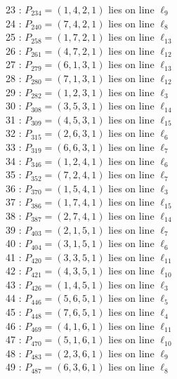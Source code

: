 \documentclass{article}
\begin{document}
{\begin{multicols}{2}
23 : $P_{234}=( 1, 4, 2, 1 )$ lies on line $\ell_{9}$\\
24 : $P_{240}=( 7, 4, 2, 1 )$ lies on line $\ell_{8}$\\
25 : $P_{258}=( 1, 7, 2, 1 )$ lies on line $\ell_{13}$\\
26 : $P_{261}=( 4, 7, 2, 1 )$ lies on line $\ell_{12}$\\
27 : $P_{279}=( 6, 1, 3, 1 )$ lies on line $\ell_{13}$\\
28 : $P_{280}=( 7, 1, 3, 1 )$ lies on line $\ell_{12}$\\
29 : $P_{282}=( 1, 2, 3, 1 )$ lies on line $\ell_{3}$\\
30 : $P_{308}=( 3, 5, 3, 1 )$ lies on line $\ell_{14}$\\
31 : $P_{309}=( 4, 5, 3, 1 )$ lies on line $\ell_{15}$\\
32 : $P_{315}=( 2, 6, 3, 1 )$ lies on line $\ell_{6}$\\
33 : $P_{319}=( 6, 6, 3, 1 )$ lies on line $\ell_{7}$\\
34 : $P_{346}=( 1, 2, 4, 1 )$ lies on line $\ell_{6}$\\
35 : $P_{352}=( 7, 2, 4, 1 )$ lies on line $\ell_{7}$\\
36 : $P_{370}=( 1, 5, 4, 1 )$ lies on line $\ell_{3}$\\
37 : $P_{386}=( 1, 7, 4, 1 )$ lies on line $\ell_{15}$\\
38 : $P_{387}=( 2, 7, 4, 1 )$ lies on line $\ell_{14}$\\
39 : $P_{403}=( 2, 1, 5, 1 )$ lies on line $\ell_{7}$\\
40 : $P_{404}=( 3, 1, 5, 1 )$ lies on line $\ell_{6}$\\
41 : $P_{420}=( 3, 3, 5, 1 )$ lies on line $\ell_{11}$\\
42 : $P_{421}=( 4, 3, 5, 1 )$ lies on line $\ell_{10}$\\
43 : $P_{426}=( 1, 4, 5, 1 )$ lies on line $\ell_{3}$\\
44 : $P_{446}=( 5, 6, 5, 1 )$ lies on line $\ell_{5}$\\
45 : $P_{448}=( 7, 6, 5, 1 )$ lies on line $\ell_{4}$\\
46 : $P_{469}=( 4, 1, 6, 1 )$ lies on line $\ell_{11}$\\
47 : $P_{470}=( 5, 1, 6, 1 )$ lies on line $\ell_{10}$\\
48 : $P_{483}=( 2, 3, 6, 1 )$ lies on line $\ell_{9}$\\
49 : $P_{487}=( 6, 3, 6, 1 )$ lies on line $\ell_{8}$\\

\end{multicols}}
\end{document}
